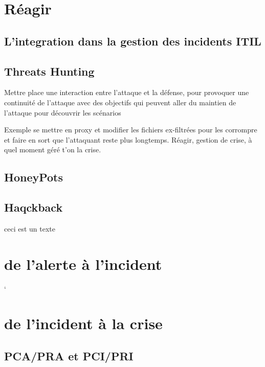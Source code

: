 
\section{Réagir}

\subsection{L'integration dans la gestion des incidents ITIL}

\subsection{Threats Hunting}

Mettre place une interaction entre l'attaque et la défense, pour provoquer une continuité de l'attaque avec des objectifs qui peuvent aller du maintien de l'attaque pour découvrir les scénarios

Exemple se mettre en proxy et modifier les fichiers ex-filtrées pour les corrompre et faire en sort que l'attaquant reste plus longtemps.
Réagir, gestion de crise, à quel moment géré t’on la crise.

\subsection{HoneyPots}

\subsection{Haqckback}


ceci est un texte

\section{de l'alerte à l'incident}`

\section{de l'incident à la crise}

\subsection{PCA/PRA et PCI/PRI}

